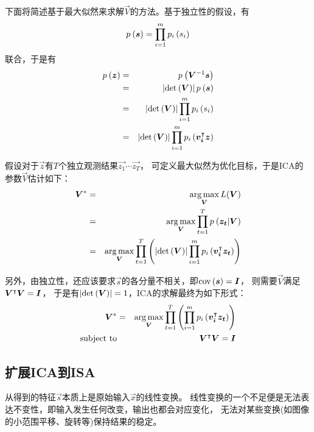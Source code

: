 下面将简述基于最大似然来求解$\vec{V}$的方法。基于独立性的假设，有
\begin{eqnarray}
    \prob{\vec{s}} = \prod_{i=1}^m\prob[i]{s_i}
    \label{eqn:ica:3}
\end{eqnarray}
联合，于是有
\begin{eqnarray}
    \prob{\vec{z}} &=&  \prob{\vec{V}^{-1}\vec{s}} \nonumber \\
        &=& \abs{\det{\vec{V}}} \prob{\vec{s}} \nonumber \\
        &=& \abs{\det{\vec{V}}}\prod_{i=1}^m\prob[i]{s_i} \nonumber \\
        &=& \abs{\det{\vec{V}}}\prod_{i=1}^m\prob[i]{\trans{\vec{v_i}}\vec{z}}
    \label{eqn:ica:4}
\end{eqnarray}

假设对于$\vec{z}$有$T$个独立观测结果$\vec{z_1}\cdots\vec{z_T}$，
可定义最大似然为优化目标，于是ICA的参数$\vec{V}$估计如下：
\begin{eqnarray}
    \vec{V}^* &=& \argmax_{\vec{V}} L(\vec{V}) \nonumber \\
    &=& \argmax_{\vec{V}} \prod_{t=1}^T \prob{\vec{z_t}|\vec{V}} \nonumber \\
    &=& \argmax_{\vec{V}} \prod_{t=1}^T \left(\abs{\det{\vec{V}}}
            \prod_{i=1}^m\prob[i]{\trans{\vec{v_i}}\vec{z_t}} \right)
    \label{eqn:ica:5}
\end{eqnarray}

另外，由独立性，还应该要求$\vec{s}$的各分量不相关，即$\text{cov}\left(\boldsymbol{s}\right) = \boldsymbol{I}$，
则需要$\vec{V}$满足$\boldsymbol{V}^\intercal\boldsymbol{V}=\boldsymbol{I}$，
于是有$\left|\text{det}\left(\boldsymbol{V}\right)\right|=1$，ICA的求解最终为如下形式：
\begin{eqnarray}
    \vec{V}^* &=& \argmax_{\vec{V}}
            \prod_{t=1}^T \left(
            \prod_{i=1}^m\prob[i]{\trans{\vec{v_i}}\vec{z_t}} \right) \nonumber
            \\
        \text{subject to} && \trans{\vec{V}}\vec{V}=\vec{I}
    \label{eqn:ica:6}
\end{eqnarray}


\subsection{扩展ICA到ISA}
从得到的特征$\vec{s}$本质上是原始输入$\vec{x}$的线性变换。
线性变换的一个不足便是无法表达不变性，即输入发生任何改变，输出也都会对应变化，
无法对某些变换(如图像的小范围平移、旋转等)保持结果的稳定。

